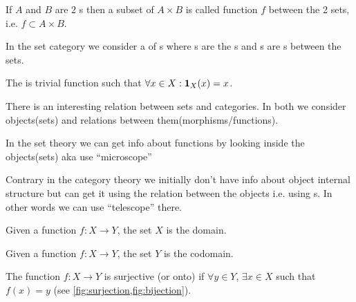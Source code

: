 \begin{definition}[Function]
  \label{def:function}
  If $A$ and $B$ are 2 s then a subset of $A \times B$ is
  called function $f$ between the 2 sets, i.e. $f \subset A \times B$.
\end{definition}


\begin{example}
  \label{ex:setcategory}
  In the set category we consider a  of
  s where 
  s are the s and
  s are s between the
  sets.

  The  is trivial function such that $\forall x \in
  X: \idarrow[X](x) = x$.
\end{example}

\begin{remark}
  \label{rem:set_vs_category}
  There is an interesting relation between sets and categories. In both
  we consider objects(sets) and relations between
  them(morphisms/functions). 

  In the set theory we can get info about functions by looking inside
  the objects(sets) aka use ``microscope'' \cite{bib:milewski2018category} 

  Contrary in the category theory we initially don't have info about object
  internal structure but can get it using the relation between the
  objects i.e. using s. In other words we can use
  ``telescope'' \cite{bib:milewski2018category}  there.
\end{remark}

\begin{definition}[Domain]
  \label{def:domain}
  Given a function $f: X \to Y$, the set $X$ is the domain.
\end{definition}

\begin{definition}[Codomain]
  \label{def:codomain}
  Given a function $f: X \to Y$, the set $Y$ is the codomain.
\end{definition}


\begin{definition}[Surjection]
  \label{def:surjection}
  The function $f: X \rightarrow Y$ is surjective (or onto) if
  $\forall y \in Y$, $\exists x \in X$ such that
  $f\left(x\right) = y$ (see \cref{fig:surjection,fig:bijection}).
\end{definition}

